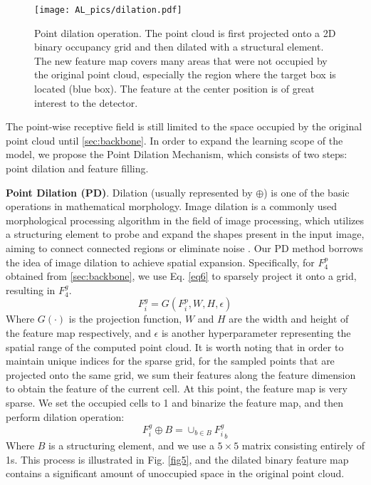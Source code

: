 \begin{figure}[t]
	\begin{center}
		\texttt{[image: AL\_pics/dilation.pdf]}
	\end{center}
	\vspace{-0.3cm}
	\caption{Point dilation operation. The point cloud is first projected onto a 2D binary occupancy grid and then dilated with a structural element. The new feature map covers many areas that were not occupied by the original point cloud, especially the region where the target box is located (blue box). The feature at the center position is of great interest to the detector.}
	\label{fig4}
	\vspace{-0.3cm}
\end{figure}

The point-wise receptive field is still limited to the space occupied by the original point cloud until \ref{sec:backbone}. In order to expand the learning scope of the model, we propose the Point Dilation Mechanism, which consists of two steps: point dilation and feature filling.

\textbf{Point Dilation (PD)}. Dilation (usually represented by $\oplus$) is one of the basic operations in mathematical morphology. Image dilation is a commonly used morphological processing algorithm in the field of image processing, which utilizes a structuring element to probe and expand the shapes present in the input image, aiming to connect connected regions or eliminate noise \cite{wu2010morphological}. Our PD method borrows the idea of image dilation to achieve spatial expansion. Specifically, for $F_4^p$ obtained from \ref{sec:backbone}, we use Eq. \ref{eq6} to sparsely project it onto a grid, resulting in $F_4^g$.
\begin{equation}
	\label{eq6}
	F_i^g=G(F_i^p, W,H,\epsilon)
\end{equation}
Where $G(\cdot)$ is the projection function, $W$ and $H$ are the width and height of the feature map respectively, and $\epsilon$ is another hyperparameter representing the spatial range of the computed point cloud. It is worth noting that in order to maintain unique indices for the sparse grid, for the sampled points that are projected onto the same grid, we sum their features along the feature dimension to obtain the feature of the current cell. At this point, the feature map is very sparse. We set the occupied cells to 1 and binarize the feature map, and then perform dilation operation:
\begin{equation}
	F_i^g\oplus B=\cup_{b\in B} {F_i^g}_b
\end{equation}
Where $B$ is a structuring element, and we use a $5\times 5$ matrix consisting entirely of 1s. This process is illustrated in Fig. \ref{fig5}, and the dilated binary feature map contains a significant amount of unoccupied space in the original point cloud.

